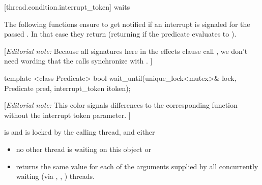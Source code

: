 






{\color{insertcolor}


[thread.condition.interrupt_token]{ waits}

The following functions ensure to get notified
if an interrupt is signaled for the passed .
In that case they return
(returning  if the predicate evaluates to ). 

{\color{blue}
[{\itshape{}Editorial note:} Because all signatures here in the effects clause call
        , we don't need wording
        that the calls synchronize with . ]
}



\begin{itemdecl}
template <class Predicate>
  bool wait_until(unique_lock<mutex>& lock,
                  Predicate pred,
                  interrupt_token itoken);
\end{itemdecl}
{\color{blue}
[{\itshape{}Editorial note:} {\color{diffcolor}This color signals differences to the corresponding  function without the interrupt token parameter.} ]
}
\begin{itemdescr}
 \pnum \requires {} is  and  is
        locked by the calling thread, and either
        \begin{itemize}
         \item no other thread is waiting on this  object or
         \item {} returns the same value for each of the 
                arguments supplied by all concurrently waiting
                (via , , ) threads.
        \end{itemize}


\end{itemdescr}}
